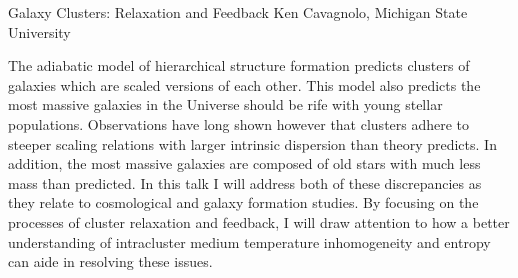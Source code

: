 Galaxy Clusters: Relaxation and Feedback
Ken Cavagnolo, Michigan State University

The adiabatic model of hierarchical structure formation predicts
clusters of galaxies which are scaled versions of each other. This
model also predicts the most massive galaxies in the Universe should
be rife with young stellar populations. Observations have long shown
however that clusters adhere to steeper scaling relations with larger
intrinsic dispersion than theory predicts. In addition, the most
massive galaxies are composed of old stars with much less mass than
predicted. In this talk I will address both of these discrepancies as
they relate to cosmological and galaxy formation studies. By
focusing on the processes of cluster relaxation and feedback, I will
draw attention to how a better understanding of intracluster medium
temperature inhomogeneity and entropy can aide in resolving these
issues.
